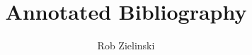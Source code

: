 \documentclass[11pt,reqno]{article}
\begin{document}
\title{Annotated Bibliography}
\author{Rob Zielinski}

\maketitle

\nocite{*}


\end{document}
